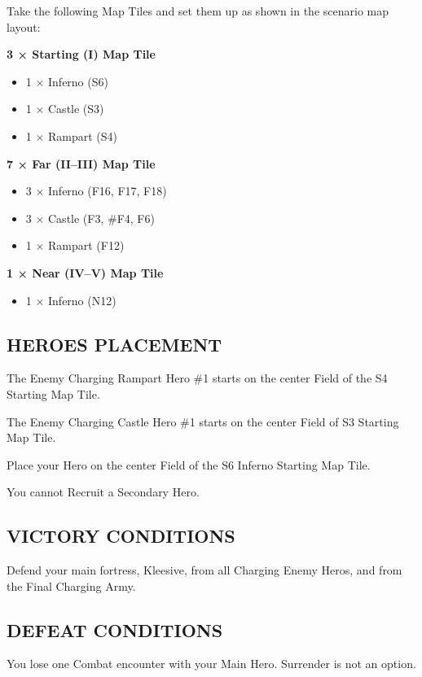 \begin{multicols*}{2}
Take the following Map Tiles and set them up as shown in the scenario map layout:

\textbf{3 × Starting (I) Map Tile}
\begin{itemize}
  \item 1 × Inferno (S6)
  \item 1 × Castle (S3)
  \item 1 × Rampart (S4)
\end{itemize}

\textbf{7 × Far (II--III) Map Tile}
\begin{itemize}
  \item 3 × Inferno (F16, F17, F18)
  \item 3 × Castle (F3, \#F4, F6)
  \item 1 × Rampart (F12)
\end{itemize}

\textbf{1 × Near (IV--V) Map Tile}
\begin{itemize}
  \item 1 × Inferno (N12)
\end{itemize}

\subsection*{\MakeUppercase{Heroes placement}}

The Enemy Charging Rampart Hero \#1 starts on the center Field of the S4 Starting Map Tile.

The Enemy Charging Castle Hero \#1 starts on the center Field of S3 Starting Map Tile.

Place your Hero on the center Field of the S6 Inferno Starting Map Tile.

You cannot Recruit a Secondary Hero.

\subsection*{\MakeUppercase{Victory Conditions}}

Defend your main fortress, Kleesive, from all Charging Enemy Heros, and from the Final Charging Army.

\subsection*{\MakeUppercase{Defeat Conditions}}

You lose one Combat encounter with your Main Hero. Surrender is not an option.


\end{multicols*}
